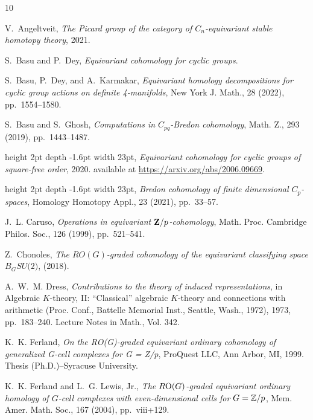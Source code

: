 \documentclass[a4paper,leqno,11pt]{amsart}
\theoremstyle{plain}
\theoremstyle{definition}
\theoremstyle{remark}
\theoremstyle{definition}
\numberwithin{equation}{section}
\begin{document}
	
	\begin{thebibliography}{10}

{\sc V.~Angeltveit}, {\em The {P}icard group of the category of
  {$C_n$}-equivariant stable homotopy theory}, 2021.

{\sc S.~Basu and P.~Dey}, {\em Equivariant cohomology for cyclic groups}.

{\sc S.~Basu, P.~Dey, and A.~Karmakar}, {\em Equivariant homology
  decompositions for cyclic group actions on definite 4-manifolds}, New York J.
  Math., 28 (2022), pp.~1554--1580.

{\sc S.~Basu and S.~Ghosh}, {\em Computations in {$C_{pq}$}-{B}redon
  cohomology}, Math. Z., 293 (2019), pp.~1443--1487.

\leavevmode\vrule height 2pt depth -1.6pt width 23pt, {\em Equivariant
  cohomology for cyclic groups of square-free order}, 2020.
\newblock available at \url{https://arxiv.org/abs/2006.09669}.

\leavevmode\vrule height 2pt depth -1.6pt width 23pt, {\em Bredon cohomology of
  finite dimensional {$C_p$}-spaces}, Homology Homotopy Appl., 23 (2021),
  pp.~33--57.

{\sc J.~L. Caruso}, {\em Operations in equivariant {${\bf Z}/p$}-cohomology},
  Math. Proc. Cambridge Philos. Soc., 126 (1999), pp.~521--541.

{\sc Z.~Chonoles}, {\em The {$RO(G)$}-graded cohomology of the equivariant
  classifying space {$B_G{SU(2})$}},  (2018).

{\sc A.~W.~M. Dress}, {\em Contributions to the theory of induced
  representations}, in Algebraic {$K$}-theory, {II}: ``{C}lassical'' algebraic
  {$K$}-theory and connections with arithmetic ({P}roc. {C}onf., {B}attelle
  {M}emorial {I}nst., {S}eattle, {W}ash., 1972), 1973, pp.~183--240. Lecture
  Notes in Math., Vol. 342.

{\sc K.~K. Ferland}, {\em On the {RO}({G})-graded equivariant ordinary
  cohomology of generalized {G}-cell complexes for {G} = {Z}/p}, ProQuest LLC,
  Ann Arbor, MI, 1999.
\newblock Thesis (Ph.D.)--Syracuse University.

{\sc K.~K. Ferland and L.~G. Lewis, Jr.}, {\em The {$R{\rm O}(G)$}-graded
  equivariant ordinary homology of {$G$}-cell complexes with even-dimensional
  cells for {$G={\Bbb Z}/p$}}, Mem. Amer. Math. Soc., 167 (2004), pp.~viii+129.


\end{thebibliography}
\end{document}
